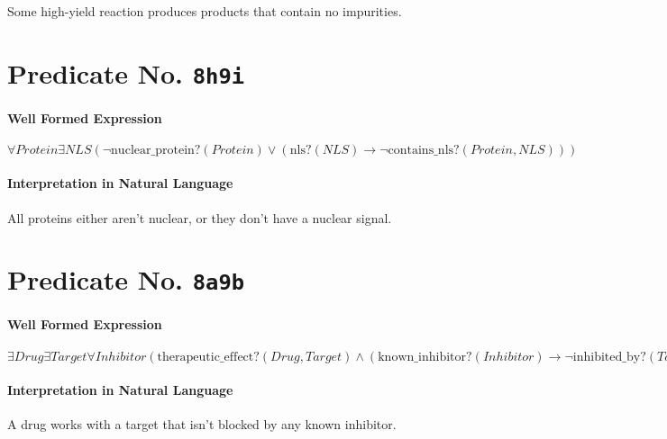\documentclass[11pt]{article}
\begin{document}
Some high-yield reaction produces products that contain no impurities.



\section{Predicate No. \texttt{8h9i}}
\label{sec:org146fe5d}

\paragraph*{Well Formed Expression}
\label{sec:org53d278d}

\(\forall \mathit{Protein} \exists \mathit{NLS} (\neg \mathrm{nuclear\_protein?}(\mathit{Protein}) \lor (\mathrm{nls?}(\mathit{NLS}) \rightarrow \neg \mathrm{contains\_nls?}(\mathit{Protein}, \mathit{NLS})))\)

\paragraph*{Interpretation in Natural Language}
\label{sec:org261cdc7}

All proteins either aren't nuclear, or they don't have a nuclear signal.



\section{Predicate No. \texttt{8a9b}}
\label{sec:org2d91a63}

\paragraph*{Well Formed Expression}
\label{sec:org05149e3}

\(\exists \mathit{Drug} \exists \mathit{Target} \forall \mathit{Inhibitor} (\mathrm{therapeutic\_effect?}(\mathit{Drug}, \mathit{Target}) \land (\mathrm{known\_inhibitor?}(\mathit{Inhibitor}) \rightarrow \neg \mathrm{inhibited\_by?}(\mathit{Target}, \mathit{Inhibitor})))\)

\paragraph*{Interpretation in Natural Language}
\label{sec:orgec4bb9a}

A drug works with a target that isn't blocked by any known inhibitor.
\end{document}
